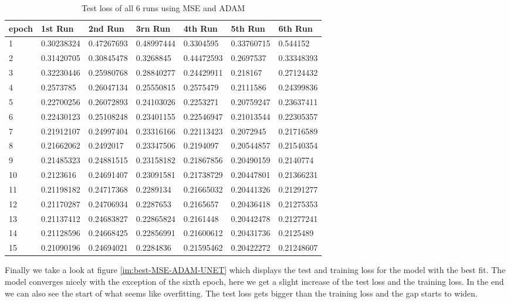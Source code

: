 \begin{table}[!ht]
    \centering
    \begin{tabular}{|l||l||l||l||l||l||l|}
    \hline
    epoch & 1st Run & 2nd Run & 3rn Run & 4th Run & 5th Run & 6th Run \\ \hline
        1 & 0.30238324 & 0.47267693 & 0.48997444 & 0.3304595 & 0.33760715 & 0.544152 \\ \hline
        2 & 0.31420705 & 0.30845478 & 0.3268845 & 0.44472593 & 0.2697537 & 0.33348393 \\ \hline
        3 & 0.32230446 & 0.25980768 & 0.28840277 & 0.24429911 & 0.218167 & 0.27124432 \\ \hline
        4 & 0.2573785 & 0.26047134 & 0.25550815 & 0.2575479 & 0.2111586 & 0.24399836 \\ \hline
        5 & 0.22700256 & 0.26072893 & 0.24103026 & 0.2253271 & 0.20759247 & 0.23637411 \\ \hline
        6 & 0.22430123 & 0.25108248 & 0.23401155 & 0.22546947 & 0.21013544 & 0.22305357 \\ \hline
        7 & 0.21912107 & 0.24997404 & 0.23316166 & 0.22113423 & 0.2072945 & 0.21716589 \\ \hline
        8 & 0.21662062 & 0.2492017 & 0.23347506 & 0.2194097 & 0.20544857 & 0.21540354 \\ \hline
        9 & 0.21485323 & 0.24881515 & 0.23158182 & 0.21867856 & 0.20490159 & 0.2140774 \\ \hline
        10 & 0.2123616 & 0.24691407 & 0.23091581 & 0.21738729 & 0.20447801 & 0.21366231 \\ \hline
        11 & 0.21198182 & 0.24717368 & 0.2289134 & 0.21665032 & 0.20441326 & 0.21291277 \\ \hline
        12 & 0.21170287 & 0.24706934 & 0.2287653 & 0.2165657 & 0.20436418 & 0.21275353 \\ \hline
        13 & 0.21137412 & 0.24683827 & 0.22865824 & 0.2161448 & 0.20442478 & 0.21277241 \\ \hline
        14 & 0.21128596 & 0.24668425 & 0.22856991 & 0.21600612 & 0.20431736 & 0.2125489 \\ \hline
        15 & 0.21090196 & 0.24694021 & 0.2284836 & 0.21595462 & 0.20422272 & 0.21248607 \\ \hline
    \end{tabular}
    \caption{\label{tab:mse_adam_test}Test loss of all 6 runs using MSE and ADAM}
\end{table}

Finally we take a look at figure \ref{im:best-MSE-ADAM-UNET} which displays the test and training
loss for the model with the best fit. The model converges nicely with the exception of the sixth epoch,
here we get a slight increase of the test loss and the training loss. In the end we can also see the start 
of what seems like overfitting. The test loss gets bigger than the training loss and the gap starts to widen.

